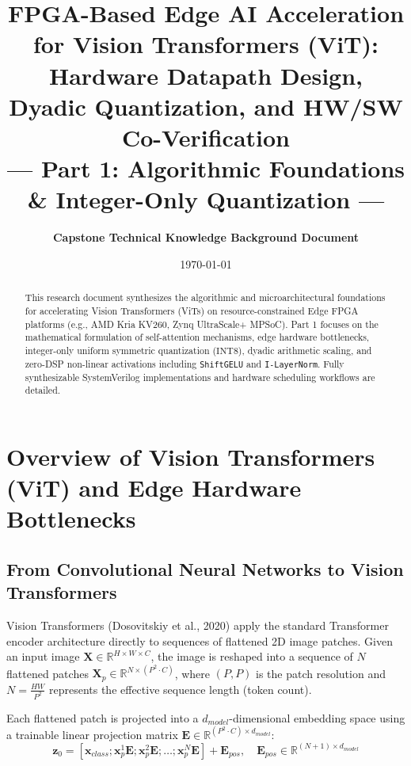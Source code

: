\documentclass[11pt,a4paper]{article}
\title{\textbf{FPGA-Based Edge AI Acceleration for Vision Transformers (ViT):\\ Hardware Datapath Design, Dyadic Quantization, and HW/SW Co-Verification}\\ \large --- Part 1: Algorithmic Foundations \& Integer-Only Quantization ---}
\author{\textbf{Capstone Technical Knowledge Background Document}}
\date{\today}
\begin{document}
\maketitle

\begin{abstract}
This research document synthesizes the algorithmic and microarchitectural foundations for accelerating Vision Transformers (ViTs) on resource-constrained Edge FPGA platforms (e.g., AMD Kria KV260, Zynq UltraScale+ MPSoC). Part 1 focuses on the mathematical formulation of self-attention mechanisms, edge hardware bottlenecks, integer-only uniform symmetric quantization ($\text{INT8}$), dyadic arithmetic scaling, and zero-DSP non-linear activations including \texttt{ShiftGELU} and \texttt{I-LayerNorm}. Fully synthesizable SystemVerilog implementations and hardware scheduling workflows are detailed.
\end{abstract}

\tableofcontents
\newpage

\section{Overview of Vision Transformers (ViT) and Edge Hardware Bottlenecks}

\subsection{From Convolutional Neural Networks to Vision Transformers}
Vision Transformers (Dosovitskiy et al., 2020) apply the standard Transformer encoder architecture directly to sequences of flattened 2D image patches. Given an input image $\mathbf{X} \in \mathbb{R}^{H \times W \times C}$, the image is reshaped into a sequence of $N$ flattened patches $\mathbf{X}_p \in \mathbb{R}^{N \times (P^2 \cdot C)}$, where $(P, P)$ is the patch resolution and $N = \frac{HW}{P^2}$ represents the effective sequence length (token count).

Each flattened patch is projected into a $d_{model}$-dimensional embedding space using a trainable linear projection matrix $\mathbf{E} \in \mathbb{R}^{(P^2 \cdot C) \times d_{model}}$:
\begin{equation}
\mathbf{z}_0 = \left[ \mathbf{x}_{class}; \mathbf{x}_p^1 \mathbf{E}; \mathbf{x}_p^2 \mathbf{E}; \dots; \mathbf{x}_p^N \mathbf{E} \right] + \mathbf{E}_{pos}, \quad \mathbf{E}_{pos} \in \mathbb{R}^{(N+1) \times d_{model}}
\end{equation}
\end{document}
